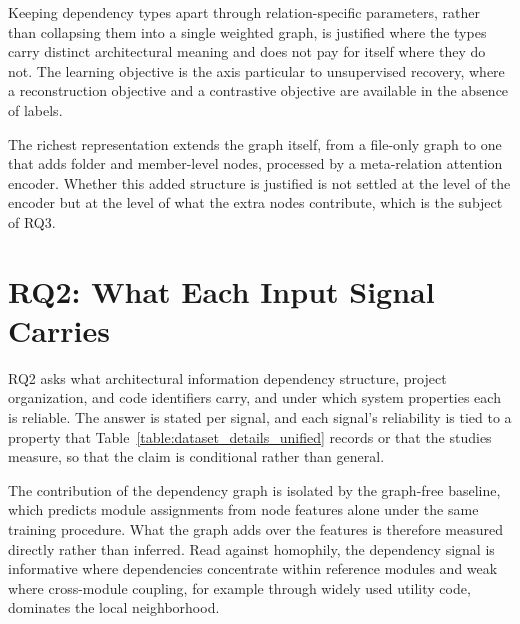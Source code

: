 Keeping dependency types apart through relation-specific parameters, rather than collapsing them into a single weighted graph, is justified where the types carry distinct architectural meaning and does not pay for itself where they do not. %
The learning objective is the axis particular to unsupervised recovery, where a reconstruction objective and a contrastive objective are available in the absence of labels. %
 
The richest representation extends the graph itself, from a file-only graph to one that adds folder and member-level nodes, processed by a meta-relation attention encoder. Whether this added structure is justified is not settled at the level of the encoder but at the level of what the extra nodes contribute, which is the subject of RQ3. %
 
\section{RQ2: What Each Input Signal Carries}
\label{sec:syn-rq2}
 
RQ2 asks what architectural information dependency structure, project organization, and code identifiers carry, and under which system properties each is reliable. The answer is stated per signal, and each signal's reliability is tied to a property that Table~\ref{table:dataset_details_unified} records or that the studies measure, so that the claim is conditional rather than general.
 
The contribution of the dependency graph is isolated by the graph-free baseline, which predicts module assignments from node features alone under the same training procedure. What the graph adds over the features is therefore measured directly rather than inferred. %
Read against homophily, the dependency signal is informative where dependencies concentrate within reference modules and weak where cross-module coupling, for example through widely used utility code, dominates the local neighborhood.
 
